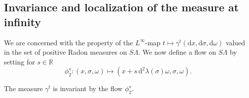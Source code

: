 \documentclass[AHL,Unicode,longabstracts]{cedram}
\newcommand*\R{{\mathbb R}}
\numberwithin{equation}{section}
\newcommand*{\dd}{\mathrm{d}}
\newcommand*{\dx}{\dd x}
\newcommand*{\dsigma}{\dd \sigma}
\newcommand*{\domega}{\dd \omega}
\begin{document}
\subsection{Invariance and localization of the measure at infinity}

We are concerned with the property of the $L^\infty$-map $t\mapsto \gamma^t(\dx,\dsigma,\domega)$ valued in the set of positive Radon measures on $S\Lambda$. We now define a flow on $S \Lambda$ by setting for $s\in\R$
\[
\phi^s_2 : (x,\sigma,\omega)\mapsto (x+s \,\dd^2\lambda(\sigma) \omega,\sigma,\omega).
\]

\goodbreak
\begin{prop}\label{prop:inv2micro}
The measure $\gamma^t$ is invariant by the flow $\phi^s_2$.
\end{prop}
\end{document}
